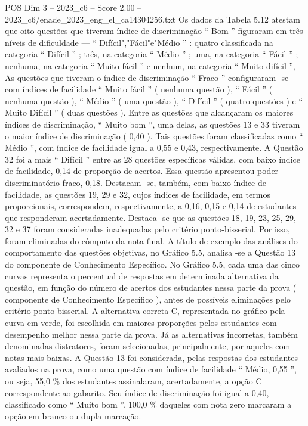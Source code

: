 \begin{textsample}{POS Dim 3 – 2023\_c6 – Score 2.00 – 2023\_c6/enade\_2023\_eng\_el\_ca14304256.txt}
Os dados da Tabela 5.12 atestam que oito questões que tiveram índice de discriminação “ Bom ” figuraram em três níveis de dificuldade — “ Difícil","Fácil"e"Médio ” : quatro classificada na categoria “ Difícil ” ; três, na categoria “ Médio ” ; uma, na categoria “ Fácil ” ; nenhuma, na categoria “ Muito fácil ” e nenhum, na categoria “ Muito difícil ”, As questões que tiveram o índice de discriminação “ Fraco ” configuraram -se com índices de facilidade “ Muito fácil ” ( nenhuma questão ), “ Fácil ” ( nenhuma questão ), “ Médio ” ( uma questão ), “ Difícil ” ( quatro questões ) e “ Muito Difícil ” ( duas questões ).
Entre as questões que alcançaram os maiores índices de discriminação, “ Muito bom ”, uma delas, as questões 13 e 33 tiveram o maior índice de discriminação ( 0,40 ).
Tais questões foram classificadas como “ Médio ”, com índice de facilidade igual a 0,55 e 0,43, respectivamente.
A Questão 32 foi a mais “ Difícil ” entre as 28 questões específicas válidas, com baixo índice de facilidade, 0,14 de proporção de acertos.
Essa questão apresentou poder discriminatório fraco, 0,18.
Destacam -se, também, com baixo índice de facilidade, as questões 19, 29 e 32, cujos índices de facilidade, em termos proporcionais, correspondem, respectivamente, a 0,16, 0,15 e 0,14 de estudantes que responderam acertadamente.
Destaca -se que as questões 18, 19, 23, 25, 29, 32 e 37 foram consideradas inadequadas pelo critério ponto-bisserial.
Por isso, foram eliminadas do cômputo da nota final.
A título de exemplo das análises do comportamento das questões objetivas, no Gráfico 5.5, analisa -se a Questão 13 do componente de Conhecimento Específico.
No Gráfico 5.5, cada uma das cinco curvas representa o percentual de respostas em determinada alternativa da questão, em função do número de acertos dos estudantes nessa parte da prova ( componente de Conhecimento Específico ), antes de possíveis eliminações pelo critério ponto-bisserial.
A alternativa correta C, representada no gráfico pela curva em verde, foi escolhida em maiores proporções pelos estudantes com desempenho melhor nessa parte da prova.
Já as alternativas incorretas, também denominadas distratores, foram selecionadas, principalmente, por aqueles com notas mais baixas.
A Questão 13 foi considerada, pelas respostas dos estudantes avaliados na prova, como uma questão com índice de facilidade “ Médio, 0,55 ”, ou seja, 55,0 \% dos estudantes assinalaram, acertadamente, a opção C correspondente ao gabarito.
Seu índice de discriminação foi igual a 0,40, classificado como “ Muito bom ”. 100,0 \% daqueles com nota zero marcaram a opção em branco ou dupla marcação.

\end{textsample}
